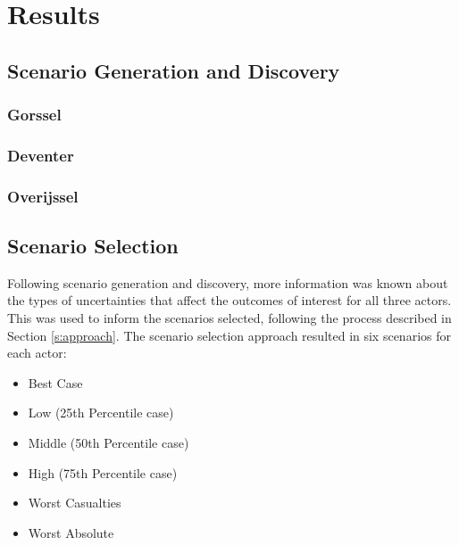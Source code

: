 \section{Results}
\label{s:results}


\subsection{Scenario Generation and Discovery}

\subsubsection{Gorssel}
\subsubsection{Deventer}
\subsubsection{Overijssel}


\subsection{Scenario Selection}
Following scenario generation and discovery, more information was known about the types of uncertainties that affect the outcomes of interest for all three actors. This was used to inform the scenarios selected, following the process described in Section \ref{s:approach}. The scenario selection approach resulted in six scenarios for each actor:
\begin{itemize}
    \item Best Case
    \item Low (25th Percentile case)
    \item Middle (50th Percentile case)
    \item High (75th Percentile case)
    \item Worst Casualties
    \item Worst Absolute
\end{itemize}
